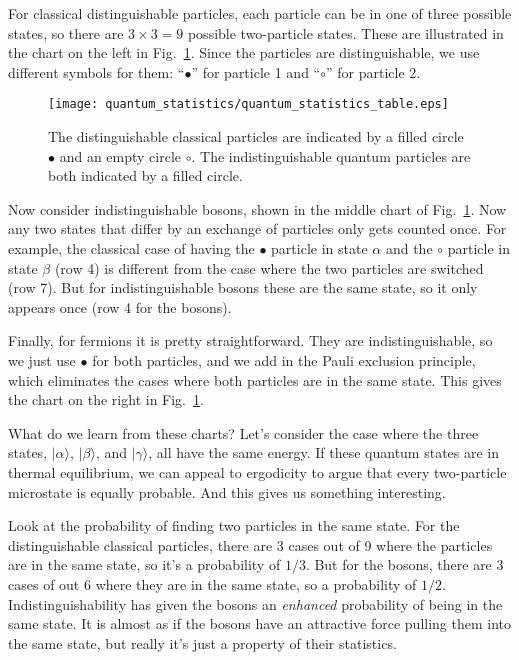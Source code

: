 For classical distinguishable particles, each particle can be in one
of three possible states, so there are $3\times 3=9$ possible
two-particle states.  These are illustrated in the chart on the left
in Fig.~\ref{fig:quantum_statistics}.  Since the particles are
distinguishable, we use different symbols for them: ``$\bullet$''
for particle 1 and ``$\circ$'' for particle 2.

\begin{figure}[h]
\begin{center}
\texttt{[image: quantum\_statistics/quantum\_statistics\_table.eps]}
\caption{The distinguishable classical particles are indicated by a
  filled circle $\bullet$ and an empty circle $\circ$.  The
  indistinguishable quantum particles are both indicated by a filled
  circle.}
\label{fig:quantum_statistics}
\end{center}
\end{figure}

Now consider indistinguishable bosons, shown in the middle chart of
Fig.~\ref{fig:quantum_statistics}.  Now any two states that differ by
an exchange of particles only gets counted once.  For example, the
classical case of having the $\bullet$ particle in state $\alpha$ and
the $\circ$ particle in state $\beta$ (row 4) is different from the
case where the two particles are switched (row 7).  But for
indistinguishable bosons these are the same state, so it only appears
once (row 4 for the bosons).

Finally, for fermions it is pretty straightforward.  They are
indistinguishable, so we just use $\bullet$ for both particles, and we
add in the Pauli exclusion principle, which eliminates the cases where
both particles are in the same state.  This gives the chart on the
right in Fig.~\ref{fig:quantum_statistics}.

What do we learn from these charts?  Let's consider the case where the
three states, $|\alpha\rangle$, $|\beta\rangle$, and $|\gamma\rangle$,
all have the same energy.  If these quantum states are in thermal
equilibrium, we can appeal to ergodicity to argue that every
two-particle microstate is equally probable.  And this gives us
something interesting.

Look at the probability of finding two particles in the same state.
For the distinguishable classical particles, there are 3 cases out of
9 where the particles are in the same state, so it's a probability of
$1/3$.  But for the bosons, there are 3 cases of out 6 where they are
in the same state, so a probability of $1/2$.  Indistinguishability
has given the bosons an \textit{enhanced} probability of being in the
same state.  It is almost as if the bosons have an attractive force
pulling them into the same state, but really it's just a property of
their statistics.

